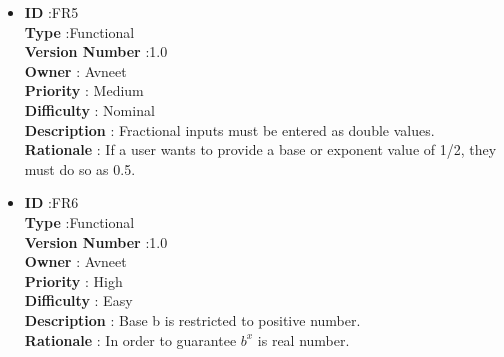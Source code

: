 \documentclass[a4paper,12pt]{report}
\begin{document}
\begin{itemize}
	\item
    \textbf{ID } \hspace{3cm} :FR5  \\
	\textbf{Type } \hspace{2.4cm}  :Functional\\
	\textbf{Version Number} \hspace{0.3cm} :1.0  \\
	\textbf{Owner } \hspace{1.98cm} : Avneet \\
	\textbf{Priority } \hspace{1.75cm} : Medium\\
	\textbf{Difficulty } \hspace{1.5cm} : Nominal\\
	\textbf{Description }\hspace{1.2cm} : Fractional inputs must be entered as double values.\\
	\textbf{Rationale }\hspace{1.6cm} : If a user wants to provide a base or exponent value of 1/2, they must do so as 0.5.\\

	\item
    \textbf{ID } \hspace{3cm} :FR6  \\
	\textbf{Type } \hspace{2.4cm}  :Functional\\
	\textbf{Version Number} \hspace{0.3cm} :1.0  \\
	\textbf{Owner } \hspace{1.98cm} : Avneet \\
	\textbf{Priority } \hspace{1.75cm} : High\\
	\textbf{Difficulty } \hspace{1.5cm} : Easy\\
	\textbf{Description }\hspace{1.2cm} : Base b is restricted to positive number.\\
	\textbf{Rationale }\hspace{1.6cm} : In order to guarantee $b^x$ is real number.\\



\end{itemize}
\end{document}
